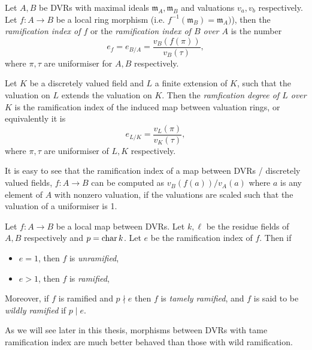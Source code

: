 \begin{definition}
	Let $A, B$ be DVRs with maximal ideals $\mathfrak{m}_A, \mathfrak{m} _B$ and valuations $v_a, v_b$ respectively.
	Let $f: A \to B$ be a local ring morphism (i.e. $f^{-1}(\mathfrak{m} _B) = \mathfrak{m} _A)$), then the \emph{ramification index of $f$} or the \emph{ramification index of $B$ over $A$} is the number \[
		e_f = e_{B / A}= \frac{v_B(f(\pi))}{v_B(\tau)}
	,\] 
	where $\pi, \tau$ are uniformiser for $A, B$ respectively. 
\end{definition}

\begin{definition}
	Let $K$ be a discretely valued field and $L$ a finite extension of $K$, such that the valuation on $L$ extends the valuation on $K$. 
	Then the \emph{ramfication degree of  $L$ over  $K$} is the ramification index of the induced map between valuation rings, or equivalently it is 
	\[
	e_{L / K}  = \frac{v_L(\pi)}{v_K(\tau)}	,\] 
	where $\pi, \tau$ are uniformiser of $L, K$ respectively. 
\end{definition}

It is easy to see that the ramification index of a map between DVRs / discretely valued fields, $f: A \to B$ can be computed as $v_B(f(a)) / v_A(a)$ where $a$ is any element of $A$ with nonzero valuation, if the valuations are scaled such that the valuation of a uniformiser is 1. 

\begin{definition}
	Let $f: A \to B$ be a local map between DVRs. 
	Let $k, \ell$ be the residue fields of $A, B$ respectively and $p = \operatorname{char} k$.
	Let $e$ be the ramification index of $f$.
	Then if
	\begin{itemize}
		\item $e = 1$, then $f$ is \emph{unramified}, 
		\item $e > 1$, then $f$ is \emph{ramified},
	\end{itemize}
	Moreover, if $f$ is ramified and $p \nmid e$ then $f$ is \emph{tamely ramified}, and  $f$ is said to be \emph{wildly ramified} if  $p \mid e$. 
\end{definition}
As we will see later in this thesis, morphisms between DVRs with tame ramification index are much better behaved than those with wild ramification. 

